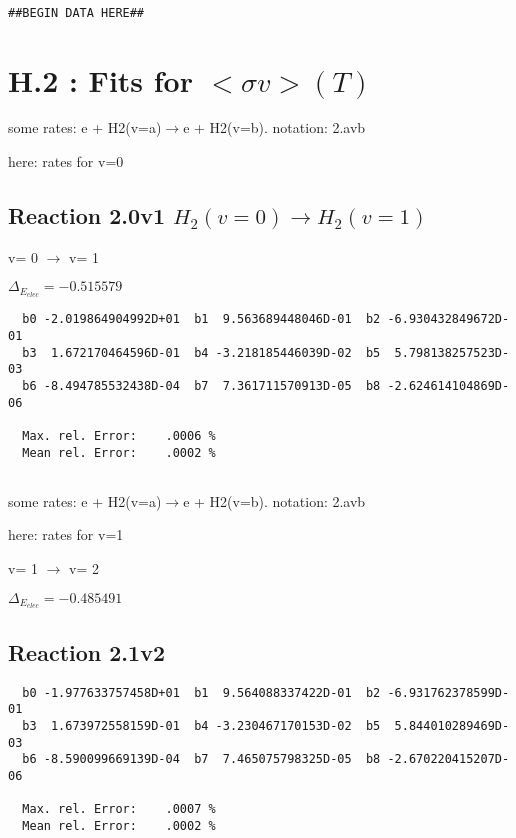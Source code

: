 \documentclass[12pt]{article}
\begin{document}
\begin{small}\begin{verbatim}

##BEGIN DATA HERE##

\end{verbatim}\end{small}

\newpage

\section{H.2 :  Fits for $<\sigma v> (T)$}

some rates: e + H2(v=a)$\rightarrow$e + H2(v=b). notation: 2.avb

here: rates for v=0
\subsection{
Reaction 2.0v1
$  H_2(v=0) \rightarrow  H_2(v=1) $
}

v=  0 $\rightarrow$ v= 1

$\Delta_{E_{elec}}=-0.515579$

\begin{small}\begin{verbatim}
  b0 -2.019864904992D+01  b1  9.563689448046D-01  b2 -6.930432849672D-01
  b3  1.672170464596D-01  b4 -3.218185446039D-02  b5  5.798138257523D-03
  b6 -8.494785532438D-04  b7  7.361711570913D-05  b8 -2.624614104869D-06

  Max. rel. Error:    .0006 %
  Mean rel. Error:    .0002 %


\end{verbatim}\end{small}

\newpage
some rates: e + H2(v=a)$\rightarrow$e + H2(v=b). notation: 2.avb

here: rates for v=1

  v=  1 $\rightarrow$ v= 2

$\Delta_{E_{elec}}=-0.485491$

\subsection{
Reaction 2.1v2
}

\begin{small}\begin{verbatim}
  b0 -1.977633757458D+01  b1  9.564088337422D-01  b2 -6.931762378599D-01
  b3  1.673972558159D-01  b4 -3.230467170153D-02  b5  5.844010289469D-03
  b6 -8.590099669139D-04  b7  7.465075798325D-05  b8 -2.670220415207D-06

  Max. rel. Error:    .0007 %
  Mean rel. Error:    .0002 %


\end{verbatim}\end{small}
\end{document}
